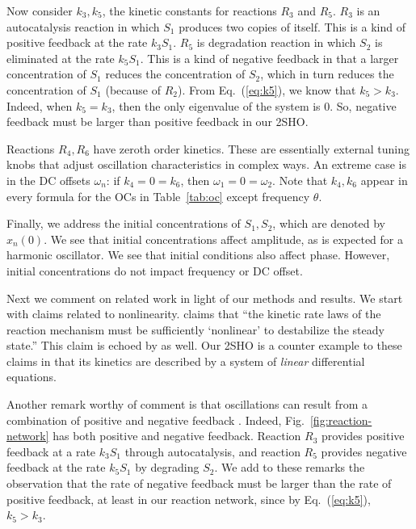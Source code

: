 \documentclass{bmcart}
\newcommand{\eqn}[1]{Eq.~(\ref{#1})}
\newcommand{\fig}[1]{Fig.~\ref{#1}}
\newcommand{\tab}[1]{Table~\ref{#1}}
\begin{document}
Now consider $k_3, k_5$, the kinetic constants for reactions $R_3$ and $R_5$. $R_3$ is an autocatalysis reaction in which $S_1$ produces two copies of itself. This is a kind of positive feedback at the rate $k_3 S_1$. $R_5$ is degradation reaction in which $S_2$ is eliminated at the rate $k_5 S_1$. This is a kind of negative feedback in that a larger concentration of $S_1$ reduces the concentration of $S_2$, which in turn reduces the concentration of $S_1$ (because of $R_2$). From \eqn{eq:k5}, we know that $k_5 > k_3$. Indeed, when $k_5 = k_3$, then the only eigenvalue of the system is 0. So, negative feedback must be larger than positive feedback in our 2SHO.

Reactions $R_4, R_6$ have zeroth order kinetics. These are essentially external tuning knobs that adjust oscillation characteristics in complex ways. An extreme case is in the DC offsets $\omega_n$: if $k_4 = 0 = k_6$, then $\omega_1 = 0 = \omega_2$. Note that $k_4, k_6$ appear in every formula for the OCs in \tab{tab:oc} except frequency $\theta$.

Finally, we address the initial concentrations of $S_1, S_2$, which are denoted by $x_n(0)$. We see that initial concentrations affect amplitude, as is expected for a harmonic oscillator. We see that initial conditions also affect phase. However, initial concentrations do not impact frequency or DC offset.

Next we comment on related work in light of our methods and results. We start with claims related to nonlinearity. \cite{gonze2021} claims that ``the kinetic rate laws of the reaction mechanism must be sufficiently ‘nonlinear’ to destabilize the steady state.” This claim is echoed by \cite{Novak2008} as well. Our 2SHO is a counter example to these claims in that its kinetics are described by a system of {\em linear} differential equations.

Another remark worthy of comment is that oscillations can result from a combination of positive and negative feedback \cite{Novak2008}.  Indeed, \fig{fig:reaction-network} has both positive and negative feedback. Reaction $R_3$ provides positive feedback at a rate $k_3 S_1$ through autocatalysis, and reaction $R_5$ provides negative feedback at the rate $k_5 S_1$ by degrading $S_2$. We add to these remarks the observation that the rate of negative feedback must be larger than the rate of positive feedback, at least in our reaction network, since by \eqn{eq:k5}, $k_5 > k_3 .$
\end{document}
